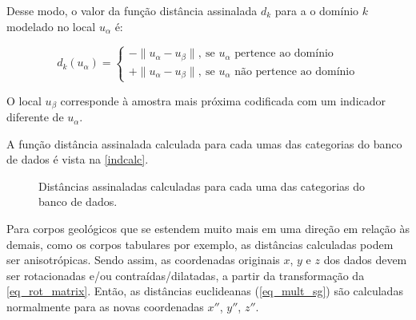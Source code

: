 Desse modo, o valor da função distância assinalada $d_k$ para a o domínio $k$ modelado no local $u_\alpha$ é:

\begin{equation}
	d_k(u_\alpha)=\begin{cases}
	-\parallel u_\alpha-u_\beta\parallel,\:\textrm{se $u_\alpha$ pertence ao domínio}\\
	+\parallel u_\alpha-u_\beta\parallel,\:\textrm{se $u_\alpha$ não pertence ao domínio}\end{cases}
    \label{eq_mult_sg}
\end{equation}

O local $u_\beta$ corresponde à amostra mais próxima codificada com um indicador diferente de $u_\alpha$.

A função distância assinalada calculada para cada umas das categorias do banco de dados é vista na \autoref{indcalc}.

\begin{figure}[H]
    \caption{Distâncias assinaladas calculadas para cada uma das categorias do banco de dados.} \label{indcalc}
     \centering
\end{figure}

Para corpos geológicos que se estendem muito mais em uma direção em relação às demais, como os corpos tabulares por exemplo, as distâncias calculadas podem ser anisotrópicas. Sendo assim, as coordenadas originais $x$, $y$ e $z$ dos dados devem ser rotacionadas e/ou contraídas/dilatadas, a partir da transformação da \autoref{eq_rot_matrix}. Então, as distâncias euclideanas (\autoref{eq_mult_sg}) são calculadas normalmente para as novas coordenadas $x''$, $y''$, $z''$.

